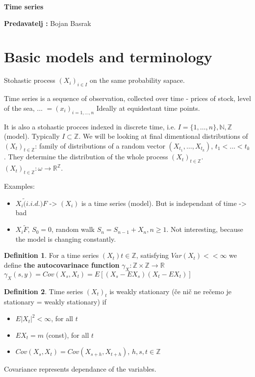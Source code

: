 \documentclass[12pt,a4paper]{amsart}
\theoremstyle{definition} %
\newtheorem{defn}{Definition}[section]
\theoremstyle{plain} %
\newcommand{\R}{\mathbb R}
\newcommand{\N}{\mathbb N}
\newcommand{\Z}{\mathbb Z}
\begin{document}
{\bf \huge Time series}

\vskip1cm

{\bf Predavatelj : } Bojan Basrak



\section{Basic models and terminology}

Stohastic process $(X_i)_{i \in I}$ on the same probability sapace.

Time series is a sequence of observation, collected over time - prices of stock, level of the sea, ... $ =  (x_i)_{i = 1, \dots, n}$
Ideally at equidestant time points. 

It is also a stohastic procces indexed in discrete time, i.e.  $I = \{1, \dots, n\}, \N, \Z$ (model). Typically $I \subset \Z$.
We will be looking at final dimentional distributions of $(X_t)_{t \in \Z}$: family of distributions of a random vector
$(X_{t_1}, \dots, X_{t_k})$, $t_1 < \dots < t_k$.
They determine the distribution of the whole process $(X_t)_{t \in \Z}$.
$(X_t)_{t \in \Z}: \omega \rightarrow \R^{\Z} $.

Examples:

\begin{itemize}
\item $X_i \tilde (i.i.d.) F$ -> $(X_i)$ is a time series (model). But is independant of time -> bad
\item $X_i \tilde F$, $S_0 = 0$, random walk $S_n = S_{n - 1} + X_n, n\geq 1$. Not interesting, because the model is changing constantly. 
\end{itemize}

\begin{defn}
For a time series $(X_t){t\in \Z}$, satisfying $Var(X_t) < <\infty$ we define {\bf the autocovarinace function} $\gamma_X : \Z \times\Z \rightarrow  \R$
$\gamma_X(s,y) = Cov(X_s, X_t) = E[(X_s - EX_s)(X_t - EX_t)]$
\end{defn}

\begin{defn}
Time series $(X_t)_t$ is weakly stationary (če nič ne rečemo je stationary = weakly stationary) if 
\begin{itemize}
\item $E|X_t|^2 < \infty$, for all $t$
\item $EX_t = m$ (const), for all $t$
\item $Cov(X_s, X_t) = Cov(X_{s+h},X_{t+h})$, $h, s, t \in \Z$
\end{itemize}
Covariance represents dependance of the variables. 
\end{defn}
\end{document}

